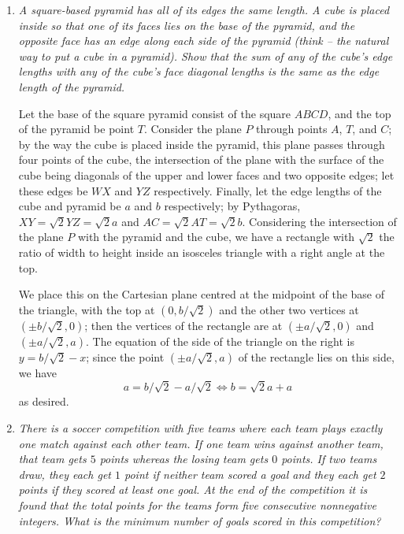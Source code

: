 \documentclass{article}
\begin{document}
\begin{enumerate}[1.]
\item %
{\itshape A square-based pyramid has all of its edges the same length.
A cube is placed inside so that one of its faces lies on the base of the pyramid, and the opposite face has an edge along each side of the pyramid (think -- the natural way to put a cube in a pyramid).
Show that the sum of any of the cube's edge lengths with any of the cube's face diagonal lengths is the same as the edge length of the pyramid.}

Let the base of the square pyramid consist of the square $ABCD$, and the top of the pyramid be point $T$.
Consider the plane $P$ through points $A$, $T$, and $C$; by the way the cube is placed inside the pyramid, this plane passes through four points of the cube, the intersection of the plane with the surface of the cube being diagonals of the upper and lower faces and two opposite edges; let these edges be $WX$ and $YZ$ respectively.
Finally, let the edge lengths of the cube and pyramid be $a$ and $b$ respectively; by Pythagoras, $XY = \sqrt{2} YZ = \sqrt{2} a$ and $AC = \sqrt{2} AT = \sqrt{2} b$.
Considering the intersection of the plane $P$ with the pyramid and the cube, we have a rectangle with $\sqrt{2}$ the ratio of width to height inside an isosceles triangle with a right angle at the top.

We place this on the Cartesian plane centred at the midpoint of the base of the triangle, with the top at $(0,b/\sqrt{2})$ and the other two vertices at $(\pm b/\sqrt{2},0)$; then the vertices of the rectangle are at $(\pm a/\sqrt{2},0)$ and $(\pm a/\sqrt{2},a)$.
The equation of the side of the triangle on the right is $y = b/\sqrt{2} -x$; since the point $(\pm a/\sqrt{2},a)$ of the rectangle lies on this side, we have
\[ a = b/\sqrt{2} -a/\sqrt{2} \iff b = \sqrt{2} a + a \]
as desired.


\item %
{\itshape There is a soccer competition with five teams where each team plays exactly one match against each other team.
If one team wins against another team, that team gets $5$ points whereas the losing team gets $0$ points.
If two teams draw, they each get $1$ point if neither team scored a goal and they each get $2$ points if they scored at least one goal.
At the end of the competition it is found that the total points for the teams form five consecutive nonnegative integers.
What is the minimum number of goals scored in this competition?}



\end{enumerate}
\end{document}
